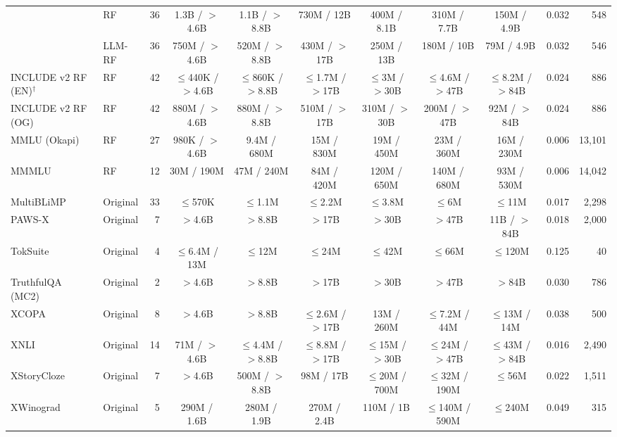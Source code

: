 \begin{tabular}{llrccccccrr}
 & RF & 36 & 1.3B / $>$4.6B & 1.1B / $>$8.8B & 730M / 12B & 400M / 8.1B & 310M / 7.7B & 150M / 4.9B & 0.032 & 548 \\
 & LLM-RF & 36 & 750M / $>$4.6B & 520M / $>$8.8B & 430M / $>$17B & 250M / 13B & 180M / 10B & 79M / 4.9B & 0.032 & 546 \\
\addlinespace
INCLUDE v2 RF (EN)$^\dagger$ & RF & 42 & $\leq$440K / $>$4.6B & $\leq$860K / $>$8.8B & $\leq$1.7M / $>$17B & $\leq$3M / $>$30B & $\leq$4.6M / $>$47B & $\leq$8.2M / $>$84B & 0.024 & 886 \\
\addlinespace
INCLUDE v2 RF (OG) & RF & 42 & 880M / $>$4.6B & 880M / $>$8.8B & 510M / $>$17B & 310M / $>$30B & 200M / $>$47B & 92M / $>$84B & 0.024 & 886 \\
\addlinespace
MMLU (Okapi) & RF & 27 & 980K / $>$4.6B & 9.4M / 680M & 15M / 830M & 19M / 450M & 23M / 360M & 16M / 230M & 0.006 & 13{,}101 \\
\addlinespace
MMMLU & RF & 12 & 30M / 190M & 47M / 240M & 84M / 420M & 120M / 650M & 140M / 680M & 93M / 530M & 0.006 & 14{,}042 \\
\addlinespace
MultiBLiMP & Original & 33 & $\leq$570K & $\leq$1.1M & $\leq$2.2M & $\leq$3.8M & $\leq$6M & $\leq$11M & 0.017 & 2{,}298 \\
\addlinespace
PAWS-X & Original & 7 & $>$4.6B & $>$8.8B & $>$17B & $>$30B & $>$47B & 11B / $>$84B & 0.018 & 2{,}000 \\
\addlinespace
TokSuite & Original & 4 & $\leq$6.4M / 13M & $\leq$12M & $\leq$24M & $\leq$42M & $\leq$66M & $\leq$120M & 0.125 & 40 \\
\addlinespace
TruthfulQA (MC2) & Original & 2 & $>$4.6B & $>$8.8B & $>$17B & $>$30B & $>$47B & $>$84B & 0.030 & 786 \\
\addlinespace
XCOPA & Original & 8 & $>$4.6B & $>$8.8B & $\leq$2.6M / $>$17B & 13M / 260M & $\leq$7.2M / 44M & $\leq$13M / 14M & 0.038 & 500 \\
\addlinespace
XNLI & Original & 14 & 71M / $>$4.6B & $\leq$4.4M / $>$8.8B & $\leq$8.8M / $>$17B & $\leq$15M / $>$30B & $\leq$24M / $>$47B & $\leq$43M / $>$84B & 0.016 & 2{,}490 \\
\addlinespace
XStoryCloze & Original & 7 & $>$4.6B & 500M / $>$8.8B & 98M / 17B & $\leq$20M / 700M & $\leq$32M / 190M & $\leq$56M & 0.022 & 1{,}511 \\
\addlinespace
XWinograd & Original & 5 & 290M / 1.6B & 280M / 1.9B & 270M / 2.4B & 110M / 1B & $\leq$140M / 590M & $\leq$240M & 0.049 & 315 \\
\bottomrule
\end{tabular}
